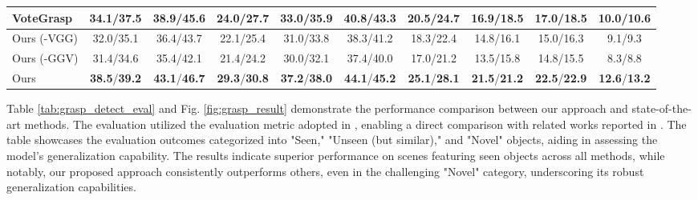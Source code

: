 \begin{table}[h]
\begin{center}
\begin{tabular}{|l|c|c|c|c|c|c|c|c|c|}
\hline
VoteGrasp \cite{hoang2022context}  & 34.1/37.5 & 38.9/45.6 & 24.0/27.7 & 33.0/35.9 & 40.8/43.3 & 20.5/24.7 & 16.9/18.5 & 17.0/18.5 & 10.0/10.6 \\
\hline
Ours (-VGG)  & 32.0/35.1 & 36.4/43.7 & 22.1/25.4 & 31.0/33.8 & 38.3/41.2 & 18.3/22.4 & 14.8/16.1 & 15.0/16.3 & 9.1/9.3 \\
\hline
Ours (-GGV)  & 31.4/34.6 & 35.4/42.1 & 21.4/24.2 & 30.0/32.1 & 37.4/40.0 & 17.0/21.2 & 13.5/15.8 & 14.8/15.5 & 8.3/8.8 \\
\hline
Ours & \textbf{38.5}/\textbf{39.2} & \textbf{43.1}/\textbf{46.7} & \textbf{29.3}/\textbf{30.8} & \textbf{37.2}/\textbf{38.0} & \textbf{44.1}/\textbf{45.2} & \textbf{25.1}/\textbf{28.1} & \textbf{21.5}/\textbf{21.2} & \textbf{22.5}/\textbf{22.9} & \textbf{12.6}/\textbf{13.2} \\
\hline
\end{tabular}
\end{center}
\end{table}

Table \ref{tab:grasp_detect_eval} and Fig. \ref{fig:grasp_result} demonstrate the performance comparison between our approach and state-of-the-art methods. The evaluation utilized the evaluation metric adopted in \cite{fang2020graspnet}, enabling a direct comparison with related works reported in \cite{fang2020graspnet, gou2021rgb}. The table showcases the evaluation outcomes categorized into "Seen," "Unseen (but similar)," and "Novel" objects, aiding in assessing the model's generalization capability. The results indicate superior performance on scenes featuring seen objects across all methods, while notably, our proposed approach consistently outperforms others, even in the challenging "Novel" category, underscoring its robust generalization capabilities.

